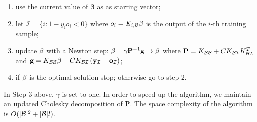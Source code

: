 \begin{enumerate}

   \item use the current value of $\boldsymbol{\beta}$ as as starting
     vector;

   \item let $\mathcal{I} = \{ i: 1-y_i o_i<0 \}$ where $o_i =
     K_{i,\mathcal{B}} \mathbf{\beta}$ is the output of the $i$-th training sample;

   \item update $\mathbf{\beta}$ with a Newton step:
     $\mathbf{\beta} - \gamma \mathbf{P}^{-1}\mathbf{g} \rightarrow \mathbf{\beta}$ where
     $\mathbf{P} = K_{\mathcal{B}\mathcal{B}} + C K_{\mathcal{B}\mathcal{I}} K_{\mathcal{B}\mathcal{I}}^T$ and
     $\mathbf{g} = K_{\mathcal{B}\mathcal{B}} \mathbf{\beta} - C K_{\mathcal{B}\mathcal{I}}
        \left( \mathbf{y}_{\mathcal{I}}-\mathbf{o}_{\mathcal{I}}\right)$;

   \item if $\mathbf{\beta}$ is the optimal solution stop; otherwise go to step
     2.

\end{enumerate}

In Step $3$ above, $\gamma$ is set to one. In order to speed up the
algorithm, we maintain an updated Cholesky decomposition of
$\mathbf{P}$. The space complexity of the algorithm is
$O(|\mathcal{B}|^2+|\mathcal{B}|l)$.
